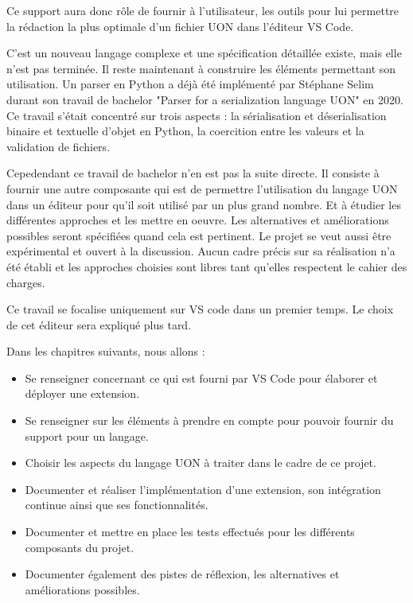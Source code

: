 \documentclass[
    iict, %
    il, %
]{heig-tb}
\begin{document}
Ce support aura donc rôle de fournir à l'utilisateur, les outils pour lui permettre la rédaction la plus optimale d'un fichier UON dans l'éditeur VS Code.

C'est un nouveau langage complexe et une spécification détaillée existe, mais elle n'est pas terminée. Il reste maintenant à construire les éléments permettant son utilisation.
Un parser en Python a déjà été implémenté par Stéphane Selim durant son travail de bachelor "Parser for a serialization language UON" en 2020.
Ce travail s'était concentré sur trois aspects : la sérialisation et déserialisation binaire et textuelle d'objet en Python, la coercition entre les valeurs et la validation de fichiers.

Cepedendant ce travail de bachelor n'en est pas la suite directe.
Il consiste à fournir une autre composante qui est de permettre l'utilisation du langage UON dans un éditeur pour qu'il soit utilisé par un plus grand nombre.
Et à étudier les différentes approches et les mettre en oeuvre.
Les alternatives et améliorations possibles seront spécifiées quand cela est pertinent.
Le projet se veut aussi être expérimental et ouvert à la discussion.
Aucun cadre précis sur sa réalisation n'a été établi et les approches choisies sont libres tant qu'elles respectent le cahier des charges.

Ce travail se focalise uniquement sur VS code dans un premier temps. Le choix de cet éditeur sera expliqué plus tard.

Dans les chapitres suivants, nous allons :

\begin{itemize}
    \item Se renseigner concernant ce qui est fourni par VS Code pour élaborer et déployer une extension.
    \item Se renseigner sur les éléments à prendre en compte pour pouvoir fournir du support pour un langage.
    \item Choisir les aspects du langage UON à traiter dans le cadre de ce projet.
    \item Documenter et réaliser l'implémentation d'une extension, son intégration continue ainsi que ses fonctionnalités.
    \item Documenter et mettre en place les tests effectués pour les différents composants du projet.
    \item Documenter également des pistes de réflexion, les alternatives et améliorations possibles.
\end{itemize}
\end{document}
